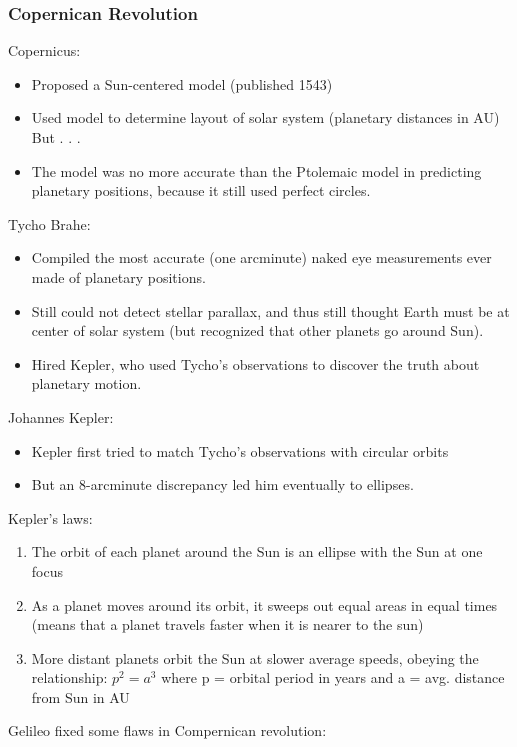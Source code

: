 \documentclass[12pt]{article}
\begin{document}
\subsubsection{Copernican Revolution}
Copernicus:
\begin{itemize}
    \item Proposed a Sun-centered model (published 1543)
    \item Used model to determine layout of solar system (planetary distances in AU) But . . .
    \item The model was no more accurate than the Ptolemaic model in predicting planetary positions, because it still used perfect circles.
\end{itemize}
Tycho Brahe:
\begin{itemize}
    \item Compiled the most accurate (one arcminute) naked eye measurements ever made of planetary positions.
    \item Still could not detect stellar parallax, and thus still thought Earth must be at center of solar system (but recognized that other planets go around Sun).
    \item Hired Kepler, who used Tycho's observations to discover the truth about planetary motion.
\end{itemize}
Johannes Kepler:
\begin{itemize}
    \item Kepler first tried to match Tycho's observations with circular orbits
    \item But an 8-arcminute discrepancy led him eventually to ellipses.
\end{itemize}
Kepler's laws:
\begin{enumerate}
    \item The orbit of each planet around the Sun is an ellipse with the Sun at one focus
    \item As a planet moves around its orbit, it sweeps out equal areas in equal times  (means that a planet travels faster when it is nearer to the sun)
    \item More distant planets orbit the Sun at slower average speeds, obeying the relationship: $p^2 = a^3$ where p = orbital period in years and a = avg. distance from Sun in AU
\end{enumerate}
Gelileo fixed some flaws in Compernican revolution:
\end{document}
